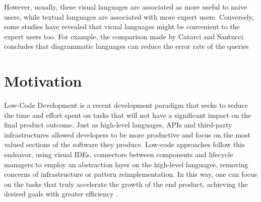 However, usually, these visual languages are associated as more useful to naive users, while textual languages are associated with more expert users.  Conversely, some studies have revealed that visual languages might be convenient to the expert users too. For example, the comparison made by Catarci and Santucci \cite{diagrammaticVsTextualQueryLanguages_aComparativeExperiment} concludes that diagrammatic languages can reduce the error rate of the queries




\section{Motivation}
\label{sec:motivation}

Low-Code Development is a recent development paradigm that seeks to reduce the time and effort spent on tasks that will not have a significant impact on the final product outcome. Just as high-level languages, APIs and third-party infrastructures allowed developers to be more productive and focus on the most valued sections of the software they produce. Low-code approaches follow this endeavor, using visual \glspl{IDE}, connectors between components and lifecycle managers to employ an abstraction layer on the high-level languages, removing concerns of infrastructure or pattern reimplementation. In this way, one can focus on the tasks that truly accelerate the growth of the end product, achieving the desired goals with greater efficiency \cite{outsystems_whatIsLowCode}.

